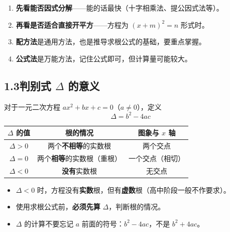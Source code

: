 \documentclass[12pt, a4paper]{ctexart}
\begin{document}
\begin{tipbox}[四种方法的选择策略]
\begin{enumerate}[leftmargin=2em]
  \item \textbf{先看能否因式分解}——能的话最快（十字相乘法、提公因式法等）。
  \item \textbf{再看是否适合直接开平方}——方程为 $(x+m)^2 = n$ 形式时。
  \item \textbf{配方法}是通用方法，也是推导求根公式的基础，要重点掌握。
  \item \textbf{公式法}是万能方法，记住公式即可，但计算量可能较大。
\end{enumerate}
\end{tipbox}

\subsection*{1.3\quad 判别式 $\Delta$ 的意义}

\begin{knowledgebox}[判别式]
对于一元二次方程 $ax^2 + bx + c = 0$（$a \neq 0$），定义
\[
\boxed{\Delta = b^2 - 4ac}
\]

\begin{center}
\renewcommand{\arraystretch}{1.5}
\begin{tabular}{|c|c|c|}
\hline
\textbf{$\Delta$ 的值} & \textbf{根的情况} & \textbf{图象与 $x$ 轴} \\
\hline
$\Delta > 0$ & 两个\textbf{不相等}的实数根 & 两个交点 \\
\hline
$\Delta = 0$ & 两个\textbf{相等}的实数根（重根） & 一个交点（相切） \\
\hline
$\Delta < 0$ & \textbf{没有}实数根 & 无交点 \\
\hline
\end{tabular}
\end{center}
\end{knowledgebox}

\begin{warnbox}[易错提醒]
\begin{itemize}[leftmargin=2em]
  \item $\Delta < 0$ 时，方程没有\textbf{实数}根，但有\textbf{虚数}根（高中阶段一般不作要求）。
  \item 使用求根公式前，\textbf{必须先算} $\Delta$，判断根的情况。
  \item $\Delta$ 的计算不要忘记 $a$ 前面的符号：$b^2 - 4ac$，不是 $b^2 + 4ac$。
\end{itemize}
\end{warnbox}
\end{document}
